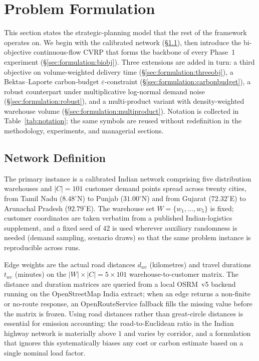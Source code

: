 \documentclass[review,preprint,authoryear,12pt]{elsarticle}
\begin{document}
\begin{table}[H]
\centering
\caption{Literature comparison matrix across the four method streams.}
\label{tab:lit_comparison}

\end{table}


\section{Problem Formulation}
\label{sec:formulation}

This section states the strategic-planning model that the rest of the
framework operates on. We begin with the calibrated network
(\S\ref{sec:formulation:network}), then introduce the bi-objective
continuous-flow CVRP that forms the backbone of every Phase~1
experiment (\S\ref{sec:formulation:biobj}). Three extensions are
added in turn: a third objective on volume-weighted delivery time
(\S\ref{sec:formulation:threeobj}), a Bektas--Laporte carbon-budget
$\varepsilon$-constraint (\S\ref{sec:formulation:carbonbudget}), a
robust counterpart under multiplicative log-normal demand noise
(\S\ref{sec:formulation:robust}), and a multi-product variant with
density-weighted warehouse volume
(\S\ref{sec:formulation:multiproduct}). Notation is collected in
Table~\ref{tab:notation}; the same symbols are reused without
redefinition in the methodology, experiments, and managerial
sections.

\subsection{Network Definition}
\label{sec:formulation:network}

The primary instance is a calibrated Indian network comprising five
distribution warehouses and $|C| = 101$ customer demand points spread
across twenty cities, from Tamil Nadu ($8.48^{\circ}$N) to Punjab
($31.00^{\circ}$N) and from Gujarat ($72.32^{\circ}$E) to Arunachal
Pradesh ($92.79^{\circ}$E). The warehouse set
$W = \{w_1, \ldots, w_5\}$ is fixed; customer coordinates are taken
verbatim from a published Indian-logistics supplement, and a fixed
seed of $42$ is used wherever auxiliary randomness is needed (demand
sampling, scenario draws) so that the same problem instance is
reproducible across runs.

Edge weights are the actual road distances $d_{wc}$ (kilometres) and
travel durations $t_{wc}$ (minutes) on the
$|W| \times |C| = 5 \times 101$ warehouse-to-customer matrix. The
distance and duration matrices are queried from a local OSRM~v5
backend running on the OpenStreetMap India extract; when an edge
returns a non-finite or no-route response, an OpenRouteService
fallback fills the missing value before the matrix is frozen. Using
road distances rather than great-circle distances is essential for
emission accounting: the road-to-Euclidean ratio in the Indian
highway network is materially above $1$ and varies by corridor, and
a formulation that ignores this systematically biases any cost or
carbon estimate based on a single nominal load factor.
\end{document}
